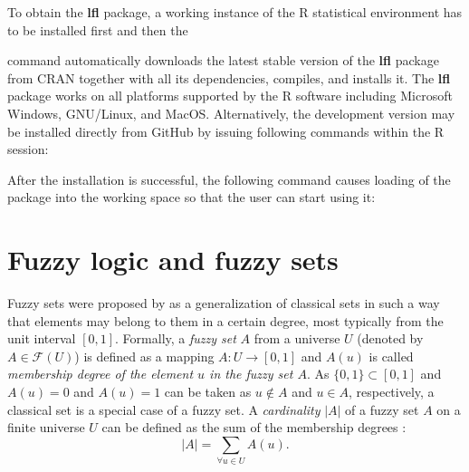 \documentclass[review]{elsarticle}
\newcommand{\pkg}[1]{\textbf{#1}}
\newcommand{\proglang}[1]{#1}
\newcommand{\R}{\proglang{R}}
\begin{document}
To obtain the \pkg{lfl} package, a working instance of the \R{} statistical environment has to be installed
first and then the
%

%
command automatically downloads the latest stable version of the \pkg{lfl} package from CRAN together with all
its dependencies, compiles, and installs it. The \pkg{lfl} package works on all platforms supported by
the \R{} software including Microsoft Windows, GNU/Linux, and MacOS. Alternatively, the development
version may be installed directly from GitHub by issuing following commands within the R session:
%

%
After the installation is successful, the following command
causes loading of the package into the working space so that the user can start using it:
%









\section{Fuzzy logic and fuzzy sets}
\label{sec:fuzzysets}

Fuzzy sets were proposed by \cite{Zadeh65} as a generalization of classical sets in such a way that elements may belong to them in a certain degree, most typically from the unit interval $[0,1]$. Formally, a \emph{fuzzy set} $A$ from a universe $U$ (denoted by $A\in\mathcal{F}(U)$) is defined as a mapping $A: U \to [0, 1]$ and $A(u)$ is called \emph{membership degree of the element $u$ in the fuzzy set $A$}. As $\{0,1\} \subset [0,1]$ and $A(u)= 0$ and $A(u) = 1$ can be taken as $u \notin A$ and $u\in A$, respectively, a classical set is a special case of a fuzzy set. A \emph{cardinality} $|A|$ of a fuzzy set $A$ on a finite universe $U$ can be defined as
the sum of the membership degrees \citep{novak1999}:
%
$$|A| = \sum_{\forall u\in U} A(u).$$
\end{document}
